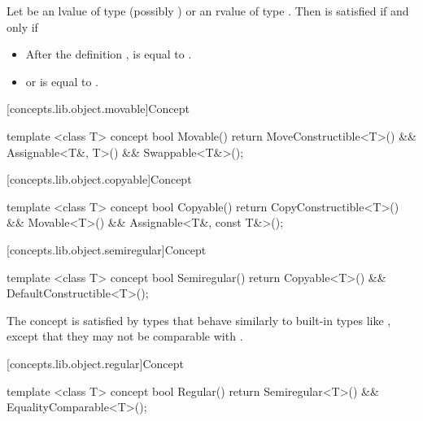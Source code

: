 \begin{itemdescr}
\pnum
Let  be an lvalue of type (possibly )
 or an rvalue of type .
Then  is satisfied if and only if

\begin{itemize}
\item After the definition ,  is equal
to .
\item {} or  is equal
to .
\end{itemize}

\end{itemdescr}

[concepts.lib.object.movable]{Concept }

%
\begin{itemdecl}
template <class T>
concept bool Movable() {
  return MoveConstructible<T>() &&
    Assignable<T&, T>() &&
    Swappable<T&>();
}
\end{itemdecl}

[concepts.lib.object.copyable]{Concept }

%
\begin{itemdecl}
template <class T>
concept bool Copyable() {
  return CopyConstructible<T>() &&
    Movable<T>() &&
    Assignable<T&, const T&>();
}
\end{itemdecl}

[concepts.lib.object.semiregular]{Concept }

%
\begin{itemdecl}
template <class T>
concept bool Semiregular() {
  return Copyable<T>() &&
    DefaultConstructible<T>();
}
\end{itemdecl}

\begin{itemdescr}
\pnum
\enternote The  concept is satisfied by types that
behave similarly to built-in types like , except that they may not be
comparable with \tcode{==}.\exitnote
\end{itemdescr}

[concepts.lib.object.regular]{Concept }

%
\begin{itemdecl}
template <class T>
concept bool Regular() {
  return Semiregular<T>() &&
    EqualityComparable<T>();
}
\end{itemdecl}

